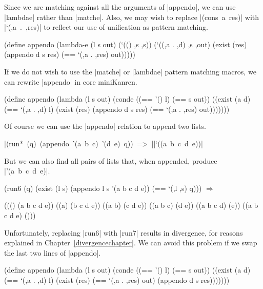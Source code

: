 Since we are matching against all the arguments of \scheme|appendo|,
we can use \scheme|lambdae| rather than \scheme|matche|.
Also, we may wish to replace \mbox{\scheme|(cons a res)|} with
\mbox{\scheme|`(,a . ,res)|} to reflect our use of unification as
pattern matching.

\schemedisplayspace
\begin{schemedisplay}
(define appendo
  (lambda-e (l s out)
    (`(() ,s ,s))
    (`((,a . ,d) ,s ,out)
     (exist (res)
       (appendo d s res)
       (== `(,a . ,res) out)))))
\end{schemedisplay}

If we do not wish to use the \scheme|matche| or \scheme|lambdae|
pattern matching macros, we can rewrite \scheme|appendo| in core
miniKanren.

\schemedisplayspace
\begin{schemedisplay}
(define appendo
  (lambda (l s out)
    (conde
      ((== '() l) (== s out))
      ((exist (a d)
         (== `(,a . ,d) l)
         (exist (res)
           (appendo d s res)
           (== `(,a . ,res) out)))))))
\end{schemedisplay}

Of course we can use the \scheme|appendo| relation to append two
lists.

\noindent\mbox{\scheme|(run* (q) (appendo '(a b c) '(d e) q)) => |}\mbox{\schemeresult|`((a b c d e))|}

\noindent But we can also find all pairs of lists that, when
appended, produce \mbox{\scheme|'(a b c d e)|}.

\schemedisplayspace
\begin{schemedisplay}
(run6 (q)
  (exist (l s)
    (appendo l s '(a b c d e))
    (== `(,l ,s) q))) $\Rightarrow$ 
\end{schemedisplay}
\nspace
\begin{schemeresponse}
((() (a b c d e))
 ((a) (b c d e))
 ((a b) (c d e))
 ((a b c) (d e))
 ((a b c d) (e))
 ((a b c d e) ()))
\end{schemeresponse}

\noindent Unfortunately, replacing \scheme|run6| with \scheme|run7|
results in divergence, for reasons explained in
Chapter~\ref{divergencechapter}.  We can avoid this problem if we swap
the last two lines of \scheme|appendo|.

\schemedisplayspace
\begin{schemedisplay}
(define appendo
  (lambda (l s out)
    (conde
      ((== '() l) (== s out))
      ((exist (a d)
         (== `(,a . ,d) l)
         (exist (res)
           (== `(,a . ,res) out)
           (appendo d s res)))))))
\end{schemedisplay}

